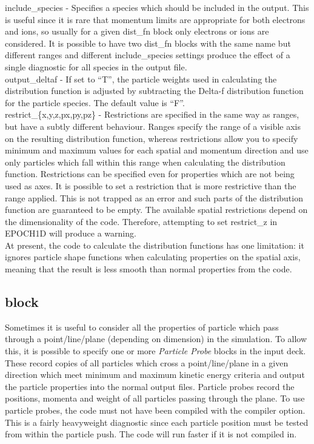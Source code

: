 {\emphtext include\_species} - Specifies a species which should be included
in the output. This is useful since it is rare that momentum limits are
appropriate for both electrons and ions, so usually for a given dist\_fn block
only electrons or ions are considered. It is possible to have two dist\_fn
blocks with the same name but different ranges and different
include\_species settings produce the effect of a single diagnostic for
all species in the output file.\\

{\emphtext output\_deltaf} - If set to ``T'', the particle weights used in
  calculating the distribution function is adjusted by subtracting the Delta-f
  distribution function for the particle species. The default value is ``F''.\\

{\emphtext restrict\_\{x,y,z,px,py,pz\}} - Restrictions are specified in the
  same way as ranges, but have a subtly different behaviour. Ranges specify
  the range of a visible axis on the resulting distribution function, whereas
  restrictions allow you to specify minimum and maximum values for each
  spatial and momentum direction and use only particles which fall within this
  range when calculating the distribution function. Restrictions can be
  specified even
  for properties which are not being used as axes. It is possible to set a
  restriction that is more restrictive than the range applied. This is not
  trapped as an error and such parts of the distribution function are
  guaranteed to be empty. The available spatial restrictions depend on the
  dimensionality of the code. Therefore,
  attempting to set restrict\_z in EPOCH1D will produce a warning.\\

At present, the code to calculate the distribution functions has one
limitation: it ignores particle shape functions when calculating properties
on the spatial axis, meaning that the result is less smooth than normal
properties from the code.


\subsection{ block}
\label{sec:probe_block}
Sometimes it is useful to consider all the properties of particle which pass
through a point/line/plane (depending on dimension) in the simulation. To
allow this, it is possible to specify one or more {\it Particle Probe} blocks
in the input deck. These record copies of all particles which cross a
point/line/plane in a given direction which meet minimum and maximum kinetic
energy criteria and output the particle properties into the normal output
files. Particle probes record the positions, momenta and weight of all
particles passing through the plane. To use particle probes, the code must
not have been
compiled with the  compiler option. This is
a fairly heavyweight diagnostic since each particle position must be tested
from within the particle push. The code will run faster if it is not compiled
in.\\


